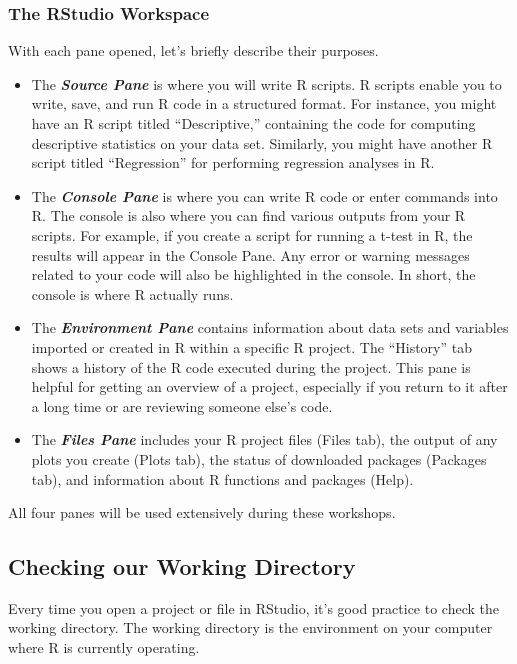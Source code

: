 \documentclass[
]{book}
\begin{document}
\hypertarget{the-rstudio-workspace}{%
\subsubsection{The RStudio Workspace}\label{the-rstudio-workspace}}

With each pane opened, let's briefly describe their purposes.

\begin{itemize}
\item
  The \textbf{\emph{Source Pane}} is where you will write R scripts. R scripts enable you to write, save, and run R code in a structured format. For instance, you might have an R script titled ``Descriptive,'' containing the code for computing descriptive statistics on your data set. Similarly, you might have another R script titled ``Regression'' for performing regression analyses in R.
\item
  The \textbf{\emph{Console Pane}} is where you can write R code or enter commands into R. The console is also where you can find various outputs from your R scripts. For example, if you create a script for running a t-test in R, the results will appear in the Console Pane. Any error or warning messages related to your code will also be highlighted in the console. In short, the console is where R actually runs.
\item
  The \textbf{\emph{Environment Pane}} contains information about data sets and variables imported or created in R within a specific R project. The ``History'' tab shows a history of the R code executed during the project. This pane is helpful for getting an overview of a project, especially if you return to it after a long time or are reviewing someone else's code.
\item
  The \textbf{\emph{Files Pane}} includes your R project files (Files tab), the output of any plots you create (Plots tab), the status of downloaded packages (Packages tab), and information about R functions and packages (Help).
\end{itemize}

All four panes will be used extensively during these workshops.

\hypertarget{checking-our-working-directory}{%
\subsection{Checking our Working Directory}\label{checking-our-working-directory}}

Every time you open a project or file in RStudio, it's good practice to check the working directory. The working directory is the environment on your computer where R is currently operating.
\end{document}
